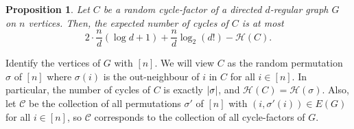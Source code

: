 \documentclass[11pt]{article}
\makeatletter
\theoremstyle{plain}
\newtheorem{proposition}[theorem]{Proposition}
\theoremstyle{definition}
\renewenvironment{proof}[1][\proofname]
{\par\pushQED{\qed}
	\normalfont\topsep6\p@\@plus6\p@\relax\trivlist
	\item[\hskip\labelsep\bfseries#1\@addpunct{.}]
	\ignorespaces}
{\popQED\endtrivlist\@endpefalse}
\newcommand{\ent}{\mathcal{H}}
\newcommand{\C}{\mathcal C}
\newcommand{\logt}{\log_2}
\DeclarePairedDelimiter{\abs}{\lvert}{\rvert}
\makeatother
\begin{document}
\begin{proposition}\label{prop:boundexpectednumberofcycles}
    Let $C$ be a random cycle-factor of a directed $d$-regular graph $G$ on $n$ vertices. Then, the expected number of cycles of $C$ is at most
    \[
        2 \cdot \frac{n}{d} (\log d + 1) + \frac{n}{d} \logt(d!) - \ent(C).
    \]
\end{proposition}

\begin{proof}
    Identify the vertices of $G$ with $[n]$. We will view $C$ as the random permutation $\sigma$ of $[n]$ where $\sigma(i)$ is the out-neighbour of $i$ in $C$ for all $i \in [n]$. In particular, the number of cycles of $C$ is exactly $\abs{\sigma}$, and $\ent(C) = \ent(\sigma)$. Also, let $\C$ be the collection of all permutations $\sigma'$ of $[n]$ with $(i,\sigma'(i)) \in E(G)$ for all $i \in [n]$, so $\C$ corresponds to the collection of all cycle-factors of $G$.


\end{proof}
\end{document}
